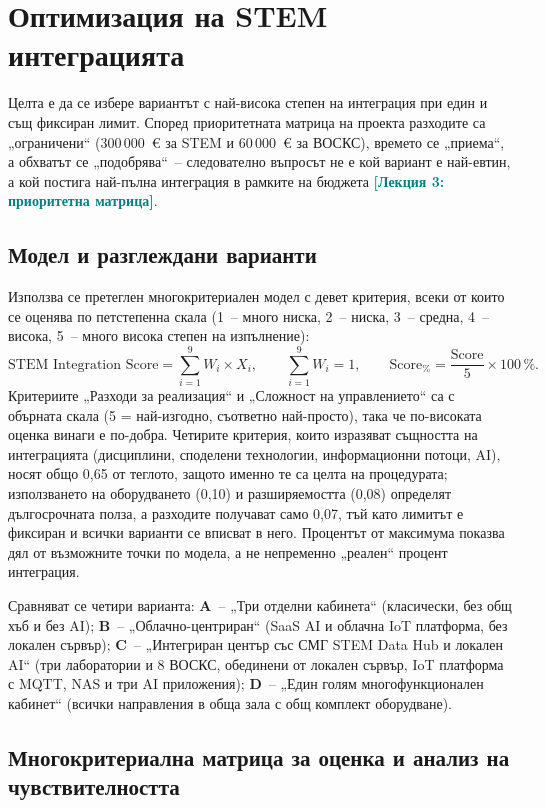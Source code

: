 \documentclass[11pt,a4paper]{article}
\newcommand{\lecturetag}[1]{\textcolor{teal}{\small\bfseries[#1]}}
\begin{document}
\clearpage%
\section{Оптимизация на STEM интеграцията}

Целта е да се избере вариантът с най-висока степен на интеграция при един и същ фиксиран лимит. Според приоритетната матрица на проекта разходите са „ограничени“ (300\,000~€ за STEM и 60\,000~€ за ВОСКС), времето се „приема“, а обхватът се „подобрява“~– следователно въпросът не е кой вариант е най-евтин, а кой постига най-пълна интеграция в рамките на бюджета \lecturetag{Лекция 3: приоритетна матрица}.

\subsection{Модел и разглеждани варианти}

Използва се претеглен многокритериален модел с девет критерия, всеки от които се оценява по петстепенна скала (1~– много ниска, 2~– ниска, 3~– средна, 4~– висока, 5~– много висока степен на изпълнение):
\[
  \textstyle \text{STEM Integration Score} = \sum_{i=1}^{9} W_i \times X_i, \qquad \sum_{i=1}^{9} W_i = 1, \qquad
  \text{Score}_{\%} = \dfrac{\text{Score}}{5} \times 100\,\%.
\]
Критериите „Разходи за реализация“ и „Сложност на управлението“ са с обърната скала (5 = най-изгодно, съответно най-просто), така че по-високата оценка винаги е по-добра. Четирите критерия, които изразяват същността на интеграцията (дисциплини, споделени технологии, информационни потоци, AI), носят общо 0,65 от теглото, защото именно те са целта на процедурата; използването на оборудването (0,10) и разширяемостта (0,08) определят дългосрочната полза, а разходите получават само 0,07, тъй като лимитът е фиксиран и всички варианти се вписват в него. Процентът от максимума показва дял от възможните точки по модела, а не непременно „реален“ процент интеграция.

Сравняват се четири варианта: \textbf{A}~– „Три отделни кабинета“ (класически, без общ хъб и без AI); \textbf{B}~– „Облачно-центриран“ (SaaS AI и облачна IoT платформа, без локален сървър); \textbf{C}~– „Интегриран център със СМГ STEM Data Hub и локален AI“ (три лаборатории и 8 ВОСКС, обединени от локален сървър, IoT платформа с MQTT, NAS и три AI приложения); \textbf{D}~– „Един голям многофункционален кабинет“ (всички направления в обща зала с общ комплект оборудване).

\subsection{Многокритериална матрица за оценка и анализ на чувствителността}
\end{document}
